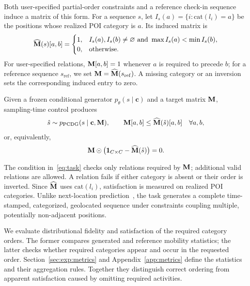Both user-specified partial-order constraints and a reference check-in
sequence induce a matrix of this form. For a sequence $s$, let
$I_s(a)=\{i:\mathrm{cat}(l_i)=a\}$ be the positions whose realized POI
category is $a$. Its induced matrix is
\begin{equation}
  \widehat{\mathbf{M}}(s)[a,b]=
  \begin{cases}
    1, & I_s(a),I_s(b)\neq\varnothing\text{ and }\max I_s(a)<\min I_s(b),\\
    0, & \text{otherwise}.
  \end{cases}
  \label{eq:induced-po-matrix}
\end{equation}
For user-specified relations, $\mathbf{M}[a,b]=1$ whenever $a$ is required to
precede $b$; for a reference sequence $s_{\mathrm{ref}}$, we set
$\mathbf{M}=\widehat{\mathbf{M}}(s_{\mathrm{ref}})$. A missing category or an inversion
sets the corresponding induced entry to zero.

\begin{definition}
Given a frozen conditional generator $p_\theta(s\mid\mathbf{c})$ and a target
matrix $\mathbf{M}$, sampling-time control produces
\begin{equation}
  \hat{s}\sim p_{\mathrm{PCDG}}(s\mid\mathbf{c},\mathbf{M}),
  \qquad
  \mathbf{M}[a,b]\leq\widehat{\mathbf{M}}(\hat{s})[a,b]
  \quad\forall a,b,
  \label{eq:task}
\end{equation}
or, equivalently,
\[
  \mathbf{M}\odot\bigl(\mathbf{1}_{C\times C}-\widehat{\mathbf{M}}(\hat{s})\bigr)=0.
\]
\end{definition}

The condition in~\eqref{eq:task} checks only relations required by $\mathbf{M}$;
additional valid relations are allowed. A relation fails if either category is
absent or their order is inverted. Since $\widehat{\mathbf{M}}$ uses
$\mathrm{cat}(l_i)$, satisfaction is measured on realized POI categories.
Unlike next-location prediction~\cite{feng2018deepmove,luo2021stan,yang2022getnext},
the task generates a complete time-stamped, categorized, geolocated sequence
under constraints coupling multiple, potentially non-adjacent positions.

We evaluate distributional fidelity and satisfaction of the required category
orders. The former compares generated and reference mobility statistics; the
latter checks whether required categories appear and occur in the requested
order. Section~\ref{sec:exp:metrics} and Appendix~\ref{app:metrics} define the
statistics and their aggregation rules. Together they distinguish correct
ordering from apparent satisfaction caused by omitting required activities.
